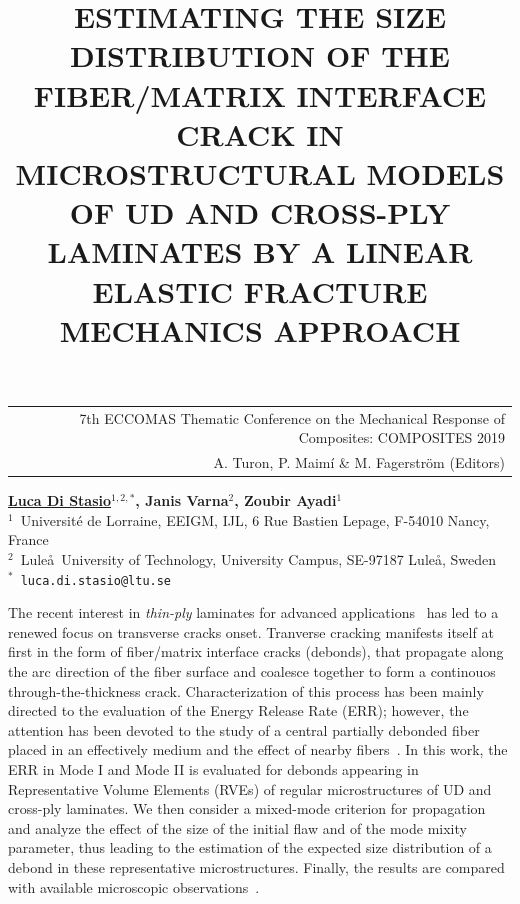 \documentclass[12pt,a4paper]{article}
\begin{document}
\thispagestyle{empty}

\vspace*{-3.4cm}
\begin{table}[!h]
\begin{tabular}{r}
\hspace*{2.9cm} \scriptsize \textsf{7th ECCOMAS Thematic Conference on the Mechanical Response of Composites: COMPOSITES 2019} \\
\hspace*{2.9cm} \tiny \textsf{A. Turon, P. Maimí \& M. Fagerström (Editors)}
\end{tabular}
\end{table}

\vspace*{-0.7cm}

\begin{center}
\title{ESTIMATING THE SIZE DISTRIBUTION OF THE FIBER/MATRIX INTERFACE CRACK IN MICROSTRUCTURAL MODELS OF UD AND CROSS-PLY LAMINATES BY A LINEAR ELASTIC FRACTURE MECHANICS APPROACH}
\end{center}
\begin{center}
\textbf{\underline{Luca Di Stasio}$^{1,2,*}$, Janis Varna$^{2}$, Zoubir Ayadi$^{1}$} \\ [7pt]
\small{$^1$~Universit\'e de Lorraine, EEIGM, IJL, 6 Rue Bastien Lepage, F-54010 Nancy, France}  \\  [2pt]
\small{$^2$~Lule\aa\ University of Technology, University Campus, SE-97187 Lule\aa, Sweden}  \\  [2pt]
\small{$^*$~\texttt{luca.di.stasio@ltu.se}} \\
\end{center}

\noindent
The recent interest in \emph{thin-ply} laminates for advanced applications~\cite{Kopp2017} has led to a renewed focus on transverse cracks onset. Tranverse cracking manifests itself at first in the form of fiber/matrix interface cracks (debonds), that propagate along the arc direction of the fiber surface and coalesce together to form a continouos through-the-thickness crack. Characterization of this process has been mainly directed to the evaluation of the Energy Release Rate (ERR); however, the attention has been devoted to the study of a central partially debonded fiber placed in an effectively medium and the effect of nearby fibers~\cite{Sandino2016}. In this work, the ERR in Mode I and Mode II is evaluated for debonds appearing in Representative Volume Elements (RVEs) of regular microstructures of UD and cross-ply laminates. We then consider a mixed-mode criterion for propagation and analyze the effect of the size of the initial flaw and of the mode mixity parameter, thus leading to the estimation of the expected size distribution of a debond in these representative microstructures. Finally, the results are compared with available microscopic observations~\cite{Correa2018}.
\end{document}
